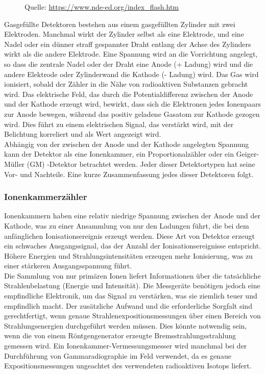 {\begin{figure}[htb]
  \label{fig:radiometer}
  Quelle: \url{https://www.nde-ed.org/index_flash.htm}
\end{figure}
Gasgefüllte Detektoren bestehen aus einem gasgefüllten Zylinder mit zwei Elektroden. Manchmal wirkt der Zylinder selbst als eine Elektrode, und eine Nadel oder ein dünner straff gespannter Draht entlang der Achse des Zylinders wirkt als die andere Elektrode. Eine Spannung wird an die Vorrichtung angelegt, so dass die zentrale Nadel oder der Draht eine Anode (+ Ladung) wird und die andere Elektrode oder Zylinderwand die Kathode (- Ladung) wird. Das Gas wird ionisiert, sobald der Zähler in die Nähe von radioaktiven Substanzen gebracht wird. Das elektrische Feld, das durch die Potentialdifferenz zwischen der Anode und der Kathode erzeugt wird, bewirkt, dass sich die Elektronen jedes Ionenpaars zur Anode bewegen, während das positiv geladene Gasatom zur Kathode gezogen wird. Dies führt zu einem elektrischen Signal, das verstärkt wird, mit der Belichtung korreliert und als Wert angezeigt wird.\\
Abhängig von der zwischen der Anode und der Kathode angelegten Spannung kann der Detektor als eine Ionenkammer, ein Proportionalzähler oder ein Geiger-Müller (GM) -Detektor betrachtet werden. Jeder dieser Detektortypen hat seine Vor- und Nachteile. Eine kurze Zusammenfassung jedes dieser Detektoren folgt.
\subsubsection{Ionenkammerzähler}
Ionenkammern haben eine relativ niedrige Spannung zwischen der Anode und der Kathode, was zu einer Ansammlung von nur den Ladungen führt, die bei dem anfänglichen Ionisationsereignis erzeugt werden. Diese Art von Detektor erzeugt ein schwaches Ausgangssignal, das der Anzahl der Ionisationsereignisse entspricht. Höhere Energien und Strahlungsintensitäten erzeugen mehr Ionisierung, was zu einer stärkeren Ausgangsspannung führt.\\
Die Sammlung von nur primären Ionen liefert Informationen über die tatsächliche Strahlenbelastung (Energie und Intensität). Die Messgeräte benötigen jedoch eine empfindliche Elektronik, um das Signal zu verstärken, was sie ziemlich teuer und empfindlich macht. Der zusätzliche Aufwand und die erforderliche Sorgfalt sind gerechtfertigt, wenn genaue Strahlenexpositionsmessungen über einen Bereich von Strahlungsenergien durchgeführt werden müssen. Dies könnte notwendig sein, wenn die von einem Röntgengenerator erzeugte Bremsstrahlungsstrahlung gemessen wird. Ein Ionenkammer-Vermessungsmesser wird manchmal bei der Durchführung von Gammaradiographie im Feld verwendet, da es genaue Expositionsmessungen ungeachtet des verwendeten radioaktiven Isotops liefert.
}
